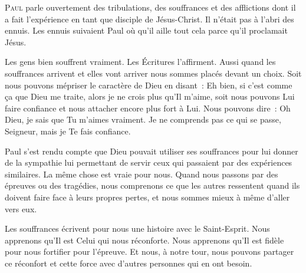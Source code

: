 \lettrine{P}{aul} parle ouvertement des tribulations,
 des souffrances et des afflictions dont il a fait
 l'expérience en tant que disciple de Jésus-Christ.
 Il n'était pas à l'abri des ennuis.
 Les ennuis suivaient Paul où qu'il aille
 \ocadr tout cela parce qu'il proclamait Jésus.


Les \Og gens bien \Fg{} souffrent vraiment.
 Les Écritures l'affirment.
 Aussi quand les souf\-fran\-ces arrivent
 \ocadr et elles vont arriver \fcadr{}
 nous sommes placés devant un choix.
 Soit nous pouvons mépriser le caractère de Dieu
 en disant~: 
 \Og Eh bien, si c'est comme \c{c}a que Dieu me traite,
 alors je ne crois plus qu'Il m'aime, \Fg{}
 soit nous pouvons Lui faire confiance et nous attacher
 encore plus fort à Lui.
 Nous pouvons dire~: 
 \Og Oh Dieu, je sais que Tu m'aimes vraiment.
 Je ne comprends pas ce qui se passe, Seigneur,
 mais je Te fais confiance. \Fg{}

Paul s'est rendu compte que Dieu pouvait utiliser
 ses souffrances pour lui donner de la sympathie
 lui permettant de servir ceux qui passaient
 par des expériences similaires.
 La même chose est vraie pour nous.
 Quand nous passons par des épreuves ou des tragédies,
 nous comprenons ce que les autres ressentent
 quand ils doivent faire face à leurs propres pertes,
 et nous sommes mieux à même d'aller vers eux.

Les souffrances écrivent pour nous une histoire
 avec le Saint-Esprit.
 Nous apprenons qu'Il est Celui qui nous réconforte.
 Nous apprenons qu'Il est fidèle pour nous fortifier pour l'épreuve.
 Et nous, à notre tour, nous pouvons partager ce réconfort
 et cette force avec d'autres personnes qui en ont besoin.

\dvrule







